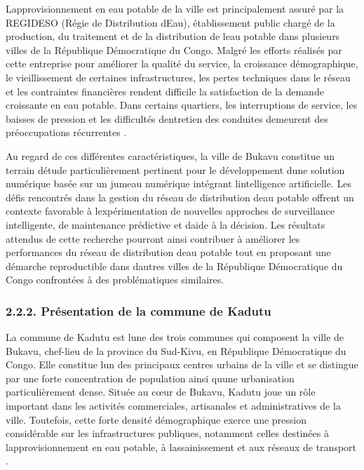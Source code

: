 \documentclass[12pt,a4paper,oneside]{report}
\begin{document}
L\textquotesingle approvisionnement en eau potable de la ville est
principalement assuré par la REGIDESO (Régie de Distribution
d\textquotesingle Eau), établissement public chargé de la production, du
traitement et de la distribution de l\textquotesingle eau potable dans
plusieurs villes de la République Démocratique du Congo. Malgré les
efforts réalisés par cette entreprise pour améliorer la qualité du
service, la croissance démographique, le vieillissement de certaines
infrastructures, les pertes techniques dans le réseau et les contraintes
financières rendent difficile la satisfaction de la demande croissante
en eau potable. Dans certains quartiers, les interruptions de service,
les baisses de pression et les difficultés d\textquotesingle entretien
des conduites demeurent des préoccupations récurrentes \cite{ref86}.

Au regard de ces différentes caractéristiques, la ville de Bukavu
constitue un terrain d\textquotesingle étude particulièrement pertinent
pour le développement d\textquotesingle une solution numérique basée sur
un jumeau numérique intégrant l\textquotesingle intelligence
artificielle. Les défis rencontrés dans la gestion du réseau de
distribution d\textquotesingle eau potable offrent un contexte favorable
à l\textquotesingle expérimentation de nouvelles approches de
surveillance intelligente, de maintenance prédictive et
d\textquotesingle aide à la décision. Les résultats attendus de cette
recherche pourront ainsi contribuer à améliorer les performances du
réseau de distribution d\textquotesingle eau potable tout en proposant
une démarche reproductible dans d\textquotesingle autres villes de la
République Démocratique du Congo confrontées à des problématiques
similaires.

\subsubsection{2.2.2. Présentation de la commune de
Kadutu}\label{pruxe9sentation-de-la-commune-de-kadutu}

La commune de Kadutu est l\textquotesingle une des trois communes qui
composent la ville de Bukavu, chef-lieu de la province du Sud-Kivu, en
République Démocratique du Congo. Elle constitue l\textquotesingle un
des principaux centres urbains de la ville et se distingue par une forte
concentration de population ainsi qu\textquotesingle une urbanisation
particulièrement dense. Située au cœur de Bukavu, Kadutu joue un rôle
important dans les activités commerciales, artisanales et
administratives de la ville. Toutefois, cette forte densité
démographique exerce une pression considérable sur les infrastructures
publiques, notamment celles destinées à
l\textquotesingle approvisionnement en eau potable, à
l\textquotesingle assainissement et aux réseaux de transport \cite{ref84}.
\end{document}
